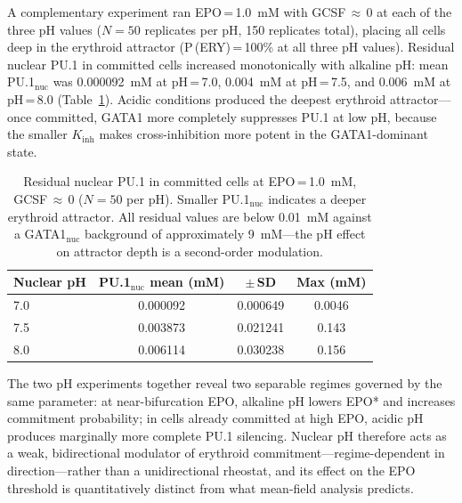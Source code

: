 A complementary experiment ran EPO\,=\,1.0~mM with GCSF\,$\approx$\,0 at
each of the three pH values ($N=50$ replicates per pH, 150 replicates total),
placing all cells deep in the erythroid attractor (P\,(ERY)\,=\,100\% at all
three pH values). Residual nuclear PU.1 in committed cells increased
monotonically with alkaline pH: mean PU.1$_\text{nuc}$ was 0.000092~mM at
pH\,=\,7.0, 0.004~mM at pH\,=\,7.5, and 0.006~mM at pH\,=\,8.0
(Table~\ref{tab:attractor_depth}). Acidic conditions produced the deepest
erythroid attractor---once committed, GATA1 more completely suppresses PU.1 at
low pH, because the smaller $K_{\mathrm{inh}}$ makes cross-inhibition more
potent in the GATA1-dominant state.

\begin{table}[ht]
\caption{Residual nuclear PU.1 in committed cells at EPO\,=\,1.0~mM,
GCSF\,$\approx$\,0 ($N=50$ per pH). Smaller PU.1$_\text{nuc}$ indicates a
deeper erythroid attractor. All residual values are below 0.01~mM against a
GATA1$_\text{nuc}$ background of approximately 9~mM---the pH effect on attractor
depth is a second-order modulation.}
\label{tab:attractor_depth}
\centering
\small
\begin{tabularx}{\linewidth}{@{}Xccc@{}}
\toprule
\textbf{Nuclear pH} & \textbf{PU.1$_\text{nuc}$ mean (mM)} & \textbf{$\pm$\,SD}
& \textbf{Max (mM)} \\
\midrule
7.0 & 0.000092 & 0.000649 & 0.0046 \\
7.5 & 0.003873 & 0.021241 & 0.143  \\
8.0 & 0.006114 & 0.030238 & 0.156  \\
\bottomrule
\end{tabularx}
\end{table}

The two pH experiments together reveal two separable regimes governed by the
same parameter: at near-bifurcation EPO, alkaline pH lowers EPO* and increases
commitment probability; in cells already committed at high EPO, acidic pH
produces marginally more complete PU.1 silencing. Nuclear pH therefore acts as a
weak, bidirectional modulator of erythroid commitment---regime-dependent in
direction---rather than a unidirectional rheostat, and its effect on the EPO
threshold is quantitatively distinct from what mean-field analysis predicts.

